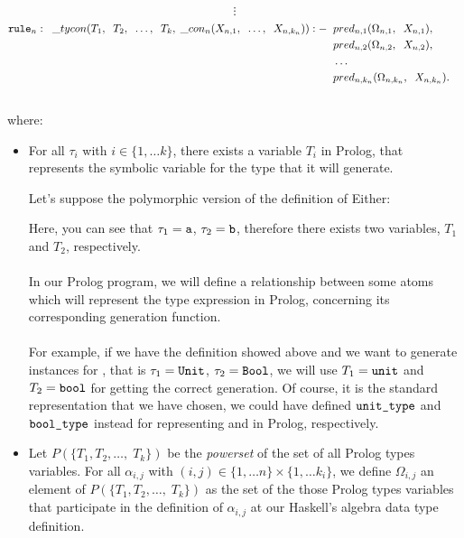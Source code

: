 	$$\vdots$$
	\begin{align*}
		\texttt{rule}_n: \;\; \_ tycon (T_1, \;\; T_2, \;\; \ldots, \;\; T_k, \; \_ con_n(X_{n,1}, \;\; \ldots, \;\; X_{n,k_n})) :-&
		\;\; pred_{n, 1}(\Omega_{n,1}, \;\; X_{n,1}), && \\
		  & \;\; pred_{n, 2}(\Omega_{n,2}, \;\; X_{n,2}),       &   &   \\
		  & \;\; \ldots \;\;                                    &   &   \\
		  & \;\; pred_{n, k_n}(\Omega_{n,k_n}, \;\; X_{n,k_n}). &   &   \\
	\end{align*}\\
	where:
	\begin{itemize}
		\item For all $\tau_i$ with $i \in \{1, \ldots k \}$, there exists a variable $T_i$ in Prolog, that represents the symbolic variable for the type that it will generate.
		      \begin{example}
		      	Let's suppose the polymorphic version of the definition of Either:
		      	
		      	Here, you can see that $\tau_1 = \texttt{a}$, $\tau_2 = \texttt{b}$, therefore there exists two variables, $T_1$ and $T_2$, respectively.\\\\
		      	In our Prolog program, we will define a relationship between some atoms which will represent the type expression in Prolog, concerning its corresponding generation function.\\\\
		      	For example, if we have the  definition showed above and we want to generate instances for , that is $\tau_1 = \texttt{Unit}$, $\tau_2 = \texttt{Bool}$, we will use $T_1 = \texttt{unit}$ and $T_2 = \texttt{bool}$ for getting the correct generation. Of course, it is the standard representation that we have chosen, we could have defined $\texttt{unit\_type}$ and $\texttt{bool\_type}$ instead for representing  and  in Prolog, respectively.
		      \end{example}
		\item Let $P(\{ T_1 , T_2, \ldots, \; T_k \})$ be the \textit{powerset} of the set of all Prolog types variables. For all $\alpha_{i,j}$ with $(i,j) \in \{1, \ldots n \} \times \{1, \ldots k_i \}$, we define $\Omega_{i,j}$ an element of $P(\{ T_1, T_2, \ldots, \; T_k \})$ as the set of the those Prolog types variables that participate in the definition of $\alpha_{i,j}$ at our Haskell's algebra data type definition.

\end{itemize}
